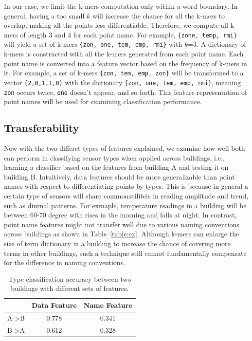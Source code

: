 In our case, we limit the k-mers computation only within a word boundary.
In general, having a too small $k$ will increase the chance for all the k-mers to overlap, making all the points less differentiable.
Therefore, we compute all k-mers of length 3 and 4 for each point name.
For example, \texttt{\{zone, temp, rmi\}} will yield a set of k-mers \texttt{\{zon, one, tem, emp, rmi\}} with $k$=3.
A dictionary of k-mers is constructed with all the k-mers generated from each point name. 
Each point name is converted into a feature vector based on the frequency of k-mers in it. 
For example, a set of k-mers \texttt{\{zon, tem, emp, zon\}} will be transformed to a vector
\texttt{(2,0,1,1,0)} with the dictionary \texttt{\{zon, one, tem, emp, rmi\}}, meaning \texttt{zon} occurs twice, \texttt{one} doesn't appear, and so forth. 
This feature representation of point names will be used for examining classification performance.

\subsection{Transferability}
Now with the two differet types of features explained, we examine how well both can perform in classifying sensor types when applied across buildings, i.e., learning a classifier based on the features from building A and testing it on building B. 
Intuitively, data features should be more generalizable than point names with respect to differentiating points by types. 
This is because in general a certain type of sensors will share commonatiliteis in reading amplitude and trend, such as diurnal patterns. 
For exmaple, temperature readings in a building will be between 60-70 degree with rises in the morning and falls at night.
In contrast, point name features might not transfer well due to various naming conventions across buildings as shown in Table~\ref{table:ex}.
Although k-mers can enlarge the size of term dictionary in a building to increase the chance of covering more terms in other buildings, such a technique still cannot fundamentally compensate for the difference in naming conventions.

\begin{table}[h]
\centering
\begin{tabular}{l|c|c}
\hline
                & Data Feature & Name Feature \\ \hline
A-\textgreater B & 0.778       & 0.341       \\
B-\textgreater A & 0.612       & 0.328       \\ \hline
\end{tabular}
\caption{Type classification accuracy between two buildings with different sets of features.}
\label{table:clf}
\end{table}


